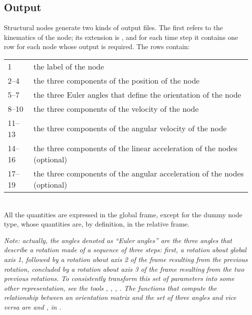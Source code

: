 \subsection{Output}\label{sec:NODE:STRUCTURAL:OUTPUT}
Structural nodes generate two kinds of output files. 
The first refers to the kinematics of the node; its extension is ,
and for each time step it contains one row for each node whose output is
required.
The rows contain: \vspace{2mm} \\
\begin{tabular}{lp{140mm}}
	\hline
	1      & the label of the node \\
	2--4   & the three components of the position of the node \\
	5--7   & the three Euler angles that define the orientation of the node \\
	8--10  & the three components of the velocity of the node \\
	11--13 & the three components of the angular velocity of the node \\
	\hline
	14--16 & the three components of the linear acceleration
		of the \kw{dynamic} nodes (optional) \\
	17--19 & the three components of the angular acceleration
		of the \kw{dynamic} nodes (optional) \\
	\hline
\end{tabular}\vspace{2mm}\\
All the quantities are expressed in the global frame, except for
the dummy  node type, whose quantities are,
by definition, in the relative frame.

\emph{Note: actually, the angles denoted as ``Euler angles'' 
are the three angles that describe a rotation made of a sequence
of three steps: first, a rotation about global axis 1,
followed by a rotation about axis 2 of the frame resulting from
the previous rotation, concluded by a rotation about axis 3
of the frame resulting from the two previous rotations.
To consistently transform this set of parameters into some other
representation, see the tools
, , , .
The functions that compute the relationship between an orientation
matrix and the set of three angles and vice versa are
 and , in .
}

